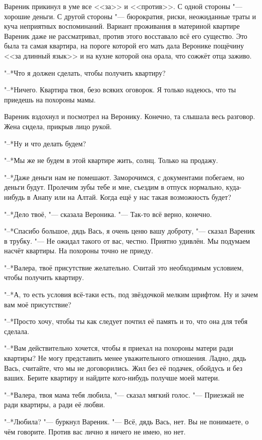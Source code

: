 Вареник прикинул в уме все <<за>> и <<против>>.
С одной стороны "--- хорошие деньги.
С другой стороны "--- бюрократия, риски, неожиданные траты и куча неприятных воспоминаний.
Вариант проживания в материной квартире Вареник даже не рассматривал, против этого восставало всё его существо.
Это была та самая квартира, на пороге которой его мать дала Веронике пощёчину <<за длинный язык>> и на кухне которой она орала, что сожжёт отца заживо.

"--*Что я должен сделать, чтобы получить квартиру?

"--*Ничего.
Квартира твоя, безо всяких оговорок.
Я только надеюсь, что ты приедешь на похороны мамы.

Вареник вздохнул и посмотрел на Веронику.
Конечно, та слышала весь разговор.
Жена сидела, прикрыв лицо рукой.

"--*Ну и что делать будем?

"--*Мы же не будем в этой квартире жить, солнц.
Только на продажу.

"--*Даже деньги нам не помешают.
Заморочимся, с документами побегаем, но деньги будут.
Пролечим зубы тебе и мне, съездим в отпуск нормально, куда-нибудь в Анапу или на Алтай.
Когда ещё у нас такая возможность будет?

"--*Дело твоё, "--- сказала Вероника.
"--- Так-то всё верно, конечно.

"--*Спасибо большое, дядь Вась, я очень ценю вашу доброту, "--- сказал Вареник в трубку.
"--- Не ожидал такого от вас, честно.
Приятно удивлён.
Мы подумаем насчёт квартиры.
На похороны точно не приеду.

"--*Валера, твоё присутствие желательно.
Считай это необходимым условием, чтобы получить квартиру.

"--*А, то есть условия всё-таки есть, под звёздочкой мелким шрифтом.
Ну и зачем вам моё присутствие?

"--*Просто хочу, чтобы ты как следует почтил её память и то, что она для тебя сделала.

"--*Вам действительно хочется, чтобы я приехал на похороны матери ради квартиры?
Не могу представить менее уважительного отношения.
Ладно, дядь Вась, считайте, что мы не договорились.
Жил без её подачек, обойдусь и без ваших.
Берите квартиру и найдите кого-нибудь получше моей матери.

"--*Валера, твоя мама тебя любила, "--- сказал мягкий голос.
"--- Приезжай не ради квартиры, а ради её любви.

"--*Любила? "--- буркнул Вареник.
"--- Всё, дядь Вась, нет.
Вы не понимаете, о чём говорите.
Против вас лично я ничего не имею, но нет.

